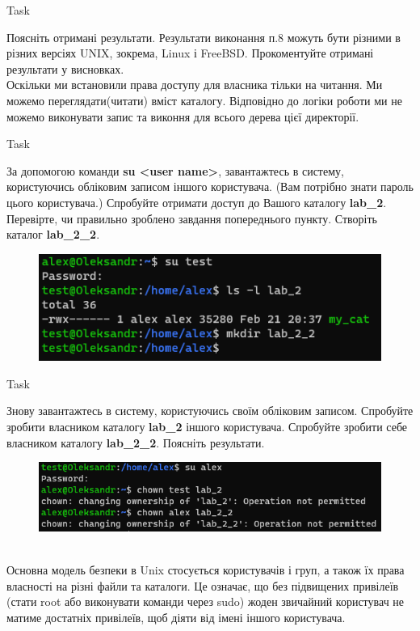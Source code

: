 \documentclass[a4paper,12pt]{article}
\newcommand{\RomanNumeralCaps}[1]{\MakeUppercase{\romannumeral #1}}
\begin{document}
    \begin{center}
        \Large{Task \RomanNumeralCaps{10}}
    \end{center}
    Поясніть отримані результати. Результати виконання п.8 можуть бути різними в різних версіях UNIX, зокрема, Linux і FreeBSD. Прокоментуйте отримані результати у
    висновках. \\
    Оскільки ми встановили права доступу для власника тільки на читання. Ми можемо переглядати(читати) вміст каталогу. 
    Відповідно до логіки роботи ми не можемо виконувати запис та виконня для всього дерева цієї директорії.
    
\newpage
    \begin{center}
        \Large{Task \RomanNumeralCaps{11}}
    \end{center}
    За допомогою команди \textbf{su <user name>}, завантажтесь в систему, користуючись обліковим записом іншого користувача. (Вам потрібно знати пароль цього
    користувача.) Спробуйте отримати доступ до Вашого каталогу \textbf{lab\_2}. Перевірте, чи правильно зроблено завдання попереднього пункту. Створіть каталог \textbf{lab\_2\_2}.
    \begin{figure}[h!]
        \begin{minipage}[h]{1\linewidth}
            \centering
            \includegraphics[width=0.6\linewidth]{Prt sc/Figure_11.png}  
        \end{minipage}
    \end{figure}

    \begin{center}
        \Large{Task \RomanNumeralCaps{12}}
    \end{center}
    Знову завантажтесь в систему, користуючись своїм обліковим записом. Спробуйте зробити власником каталогу \textbf{lab\_2} іншого користувача. Спробуйте зробити 
    себе власником каталогу \textbf{lab\_2\_2}. Поясніть результати.
    \begin{figure}[h!]
        \begin{minipage}[h]{1\linewidth}
            \centering
            \includegraphics[width=0.6\linewidth]{Prt sc/Figure_12.png}  
        \end{minipage}
    \end{figure} \\
    Основна модель безпеки в Unix стосується користувачів і груп, а також їх права власності на різні файли та каталоги. Це означає, що без 
    підвищених привілеїв (стати root або виконувати команди через sudo) жоден звичайний користувач не матиме достатніх привілеїв, щоб діяти від імені іншого користувача.
\end{document}
